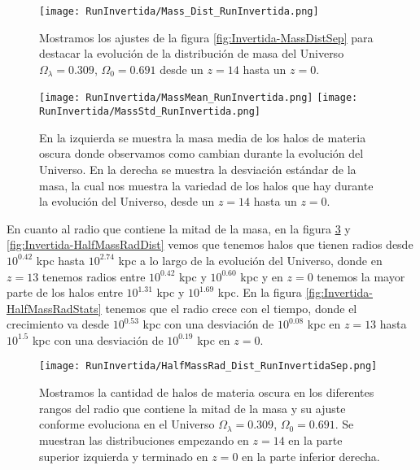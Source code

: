 \begin{figure}[H]
    \centering
    \texttt{[image: RunInvertida/Mass\_Dist\_RunInvertida.png]}
    \caption[Comparación de distribución de masa]{\footnotesize Mostramos los ajustes de la figura \ref{fig:Invertida-MassDistSep} para destacar la evolución de la distribución de masa del Universo $\Omega_\lambda = 0.309 $, $\Omega_0 = 0.691$ desde un $z=14$ hasta un $z=0$.}
    \label{fig:Invertida-MassDist}
\end{figure}

\begin{figure}[H]
    \centering
    \texttt{[image: RunInvertida/MassMean\_RunInvertida.png]}
    \texttt{[image: RunInvertida/MassStd\_RunInvertida.png]}
    \caption[Media y desviación estándar de la distribución de masa]{\footnotesize En la izquierda se muestra la masa media de los halos de materia oscura donde observamos como cambian durante la evolución del Universo. En la derecha se muestra la desviación estándar de la masa, la cual nos muestra la variedad de los halos que hay durante la evolución del Universo, desde un $z=14$ hasta un $z=0$.}
    \label{fig:Invertida-MassStats}
\end{figure}

En cuanto al radio que contiene la mitad de la masa, en la figura \ref{fig:Invertida-HalfMassRadDistSep} y \ref{fig:Invertida-HalfMassRadDist} vemos que tenemos halos que tienen radios desde $10^{0.42}$ kpc hasta $10^{2.74}$ kpc a lo largo de la evolución del Universo, donde en $z=13$ tenemos radios entre $10^{0.42}$ kpc y $10^{0.60}$ kpc y en $z=0$ tenemos la mayor parte de los halos entre $10^{1.31}$ kpc y $10^{1.69}$ kpc. En la figura \ref{fig:Invertida-HalfMassRadStats} tenemos que el radio crece con el tiempo, donde el crecimiento va desde $10^{0.53}$ kpc con una desviación de $10^{0.08}$ kpc en $z=13$ hasta $10^{1.5}$ kpc con una desviación de $10^{0.19}$ kpc en $z=0$.

\begin{figure}[H]
    \centering
    \texttt{[image: RunInvertida/HalfMassRad\_Dist\_RunInvertidaSep.png]}
    \caption[Radio que contiene la mitad de la masa]{\footnotesize Mostramos la cantidad de halos de materia oscura en los diferentes rangos del radio que contiene la mitad de la masa y su ajuste conforme evoluciona en el Universo $\Omega_\lambda = 0.309 $, $\Omega_0 = 0.691$. Se muestran las distribuciones empezando en $z=14$ en la parte superior izquierda y terminado en $z=0$ en la parte inferior derecha.}
    \label{fig:Invertida-HalfMassRadDistSep}
\end{figure}


